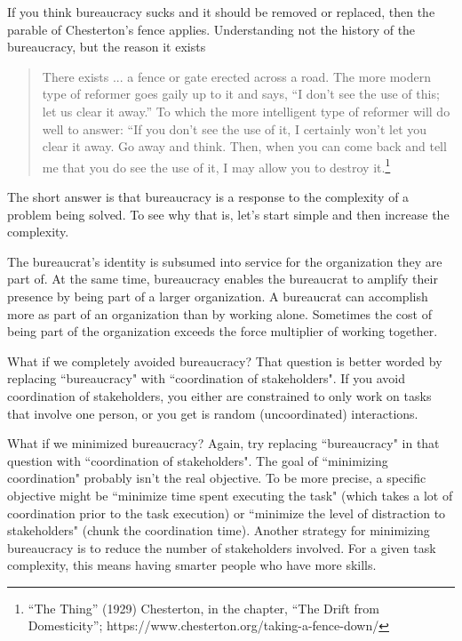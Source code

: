If you think bureaucracy sucks and it should be removed or replaced, then the parable of Chesterton's fence applies. Understanding not the history of the bureaucracy, but the reason it exists

\begin{quote}
There exists ... a fence or gate erected across a road. The more modern type of reformer goes gaily up to it and says, “I don’t see the use of this; let us clear it away.” To which the more intelligent type of reformer will do well to answer: “If you don’t see the use of it, I certainly won’t let you clear it away. Go away and think. Then, when you can come back and tell me that you do see the use of it, I may allow you to destroy it.\footnote{``The Thing'' (1929) Chesterton, in the chapter, “The Drift from Domesticity”; https://www.chesterton.org/taking-a-fence-down/}
\end{quote}


The short answer is that bureaucracy is a response to the complexity of a problem being solved. To see why that is, let's start simple and then increase the complexity. 



The bureaucrat's identity is subsumed into service for the organization they are part of. At the same time, bureaucracy enables the bureaucrat to amplify their presence by being part of a larger organization. A bureaucrat can accomplish more as part of an organization than by working alone. Sometimes the cost of being part of the organization exceeds the force multiplier of working together. 


What if we completely avoided bureaucracy? That question is better worded by replacing ``bureaucracy" with ``coordination of stakeholders". If you avoid coordination of stakeholders, you either are constrained to only work on tasks that involve one person, or you get is random (uncoordinated) interactions. 

What if we minimized bureaucracy? Again, try replacing ``bureaucracy" in that question with ``coordination of stakeholders". The goal of ``minimizing coordination" probably isn't the real objective. To be more precise, a specific objective might be ``minimize time spent executing the task" (which takes a lot of coordination prior to the task execution) or ``minimize the level of distraction to stakeholders" (chunk the coordination time). Another strategy for minimizing bureaucracy is to reduce the number of stakeholders involved. For a given task complexity, this means having smarter people who have more skills. 


